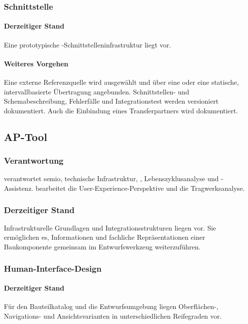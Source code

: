 \documentclass[type=zwischenbericht]{zukunftbau}
\begin{document}
\subsubsection{Schnittstelle}

\paragraph{Derzeitiger Stand}
Eine prototypische -Schnittstelleninfrastruktur liegt vor.

\paragraph{Weiteres Vorgehen}
Eine externe Referenzquelle wird ausgewählt und über eine  oder eine statische, intervallbasierte Übertragung angebunden. Schnittstellen- und Schemabeschreibung, Fehlerfälle und Integrationstest werden versioniert dokumentiert. Auch die Einbindung eines Transferpartners wird dokumentiert.

\subsection{AP-Tool}

\subsubsection{Verantwortung}
 verantwortet semio, technische Infrastruktur, , Lebenszyklusanalyse und -Assistenz.  bearbeitet die User-Experience-Perspektive und die Tragwerksanalyse.

\subsubsection{Derzeitiger Stand}
Infrastrukturelle Grundlagen und Integrationsstrukturen liegen vor. Sie ermöglichen es, Informationen und fachliche Repräsentationen einer Baukomponente gemeinsam im Entwurfswerkzeug weiterzuführen.

\subsubsection{Human-Interface-Design}

\paragraph{Derzeitiger Stand}
Für den Bauteilkatalog und die Entwurfsumgebung liegen Oberflächen-, Navigations- und Ansichtsvarianten in unterschiedlichen Reifegraden vor.
\end{document}
